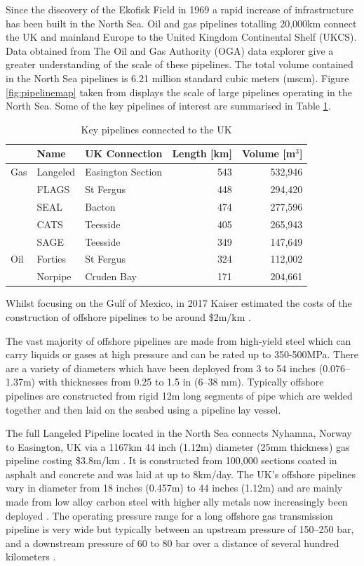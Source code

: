 \documentclass[preprint,12pt]{elsarticle}
\begin{document}
Since the discovery of the Ekofisk Field in 1969 a rapid increase of infrastructure has been built in the North Sea. Oil and gas pipelines totalling 20,000km \cite{OGA2019} connect the UK and mainland Europe to the United Kingdom Continental Shelf (UKCS).  Data obtained from The Oil and Gas Authority (OGA) data explorer \cite{OGAdata} give a greater understanding of the scale of these pipelines. The total volume contained in the North Sea pipelines is 6.21 million standard cubic meters (mscm). Figure \ref{fig:pipelinemap} taken from \cite{pipelinemap} displays the scale of large pipelines operating in the North Sea. Some of the key pipelines of interest are summarised in Table \ref{tab:ukpipes}.  

\begin{table}[H]
    \centering
   \begin{tabular}{lllrr}
\hline
 & Name & UK Connection & Length   {[}km{]} & Volume   {[}m$^3${]} \\ \hline
Gas & Langeled & Easington Section & 543 & 532,946 \\
 & FLAGS & St Fergus & 448 & 294,420 \\
 & SEAL & Bacton & 474 & 277,596 \\
 & CATS & Teesside & 405 & 265,943 \\
 & SAGE & Teesside & 349 & 147,649 \\
Oil & Forties & St Fergus & 324 & 112,002 \\
 & Norpipe & Cruden Bay & 171 & 204,661 \\ \hline
\end{tabular}
    \caption{Key pipelines connected to the UK}
    \label{tab:ukpipes}
\end{table}

Whilst focusing on the Gulf of Mexico, in 2017 Kaiser estimated the costs of the construction of offshore pipelines to be around \$2m/km \cite{KAISER2017147}. 

The vast majority of offshore pipelines are made from high-yield steel which can carry liquids or gases at high pressure and can be rated up to 350-500MPa. There are a variety of diameters which have been deployed from 3 to 54 inches (0.076–1.37m) with thicknesses from 0.25 to 1.5 in (6–38 mm). Typically offshore pipelines are constructed from rigid 12m long segments of pipe which are welded together and then laid on the seabed using a pipeline lay vessel.

The full Langeled Pipeline located in the North Sea connects Nyhamna, Norway to Easington, UK via a 1167km 44 inch (1.12m) diameter (25mm thickness) gas pipeline costing \$3.8m/km \cite{KaieteurNews2021}. It is constructed from 100,000 sections coated in asphalt and concrete and was laid at up to 8km/day. The UK's offshore pipelines vary in diameter from 18 inches (0.457m) to 44 inches (1.12m) and are mainly made from low alloy carbon steel with higher ally metals now increasingly been deployed \cite {HSE}. The operating pressure range for a long offshore gas transmission pipeline is very wide but typically between an upstream pressure of 150–250 bar, and a downstream pressure of 60 to 80 bar over a distance of several hundred kilometers \cite{Campbell}. 
\end{document}
